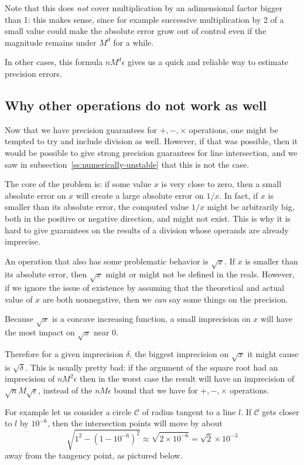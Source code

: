 Note that this does \emph{not} cover multiplication by an adimensional factor bigger than 1: this makes sense, since for example successive multiplication by 2 of a small value could make the absolute error grow out of control even if the magnitude remains under $M^d$ for a while.

In other cases, this formula $nM^d\epsilon$ gives us a quick and reliable way to estimate precision errors.

\subsection{Why other operations do not work as well}\label{ss:other-operations}
Now that we have precision guarantees for $+,-,\times$ operations, one might be tempted to try and include division as well. However, if that was possible, then it would be possible to give strong precision guarantees for line intersection, and we saw in subsection~\ref{ss:numerically-unstable} that this is not the case.

The core of the problem is: if some value $x$ is very close to zero, then a small absolute error on $x$ will create a large absolute error on $1/x$. In fact, if $x$ is smaller than its absolute error, the computed value $1/x$ might be arbitrarily big, both in the positive or negative direction, and might not exist. This is why it is hard to give guarantees on the results of a division whose operands are already imprecise.

An operation that also has some problematic behavior is $\sqrt{x}$. If $x$ is smaller than its absolute error, then $\sqrt{x}$ might or might not be defined in the reals. However, if we ignore the issue of existence by assuming that the theoretical and actual value of $x$ are both nonnegative, then we \emph{can} say some things on the precision.

Because $\sqrt{x}$ is a concave increasing function, a small imprecision on $x$ will have the most impact on $\sqrt{x}$ near 0.


Therefore for a given imprecision $\delta$, the biggest imprecision on $\sqrt{x}$ it might cause is $\sqrt{\delta}$. This is usually pretty bad: if the argument of the square root had an imprecision of $nM^2\epsilon$ then in the worst case the result will have an imprecision of $\sqrt{n}M\sqrt{\epsilon}$, instead of the $nM\epsilon$ bound that we have for $+,-,\times$ operations.

For example let us consider a circle $\mathcal{C}$ of radius tangent to a line $l$. If $\mathcal{C}$ gets closer to $l$ by $10^{-6}$, then the intersection points will move by about
\[\sqrt{1^2 - (1-10^{-6})^2} \approx \sqrt{2\times 10^{-6}} = \sqrt{2} \times 10^{-3}\]
away from the tangency point, as pictured below.

